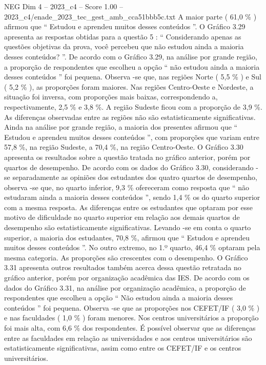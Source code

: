 \begin{textsample}{NEG Dim 4 – 2023\_c4 – Score 1.00 – 2023\_c4/enade\_2023\_tec\_gest\_amb\_cca51bbb5c.txt}
A maior parte ( 61,0 \% ) afirmou que “ Estudou e aprendeu muitos desses conteúdos ”.
O Gráfico 3.29 apresenta as respostas obtidas para a questão 5 : “ Considerando apenas as questões objetivas da prova, você percebeu que não estudou ainda a maioria desses conteúdos? ”.
De acordo com o Gráfico 3.29, na análise por grande região, a proporção de respondentes que escolheu a opção “ não estudou ainda a maioria desses conteúdos ” foi pequena.
Observa -se que, nas regiões Norte ( 5,5 \% ) e Sul ( 5,2 \% ), as proporções foram maiores.
Nas regiões Centro-Oeste e Nordeste, a situação foi inversa, com proporções mais baixas, correspondendo a, respectivamente, 2,5 \% e 3,8 \%.
A região Sudeste ficou com a proporção de 3,9 \%.
As diferenças observadas entre as regiões não são estatisticamente significativas.
Ainda na análise por grande região, a maioria dos presentes afirmou que “ Estudou e aprendeu muitos desses conteúdos ”, com proporções que variam entre 57,8 \%, na região Sudeste, a 70,4 \%, na região Centro-Oeste.
O Gráfico 3.30 apresenta os resultados sobre a questão tratada no gráfico anterior, porém por quartos de desempenho.
De acordo com os dados do Gráfico 3.30, considerando -se separadamente as opiniões dos estudantes dos quatro quartos de desempenho, observa -se que, no quarto inferior, 9,3 \% ofereceram como resposta que “ não estudaram ainda a maioria desses conteúdos ”, sendo 1,4 \% os do quarto superior com a mesma resposta.
As diferenças entre os estudantes que optaram por esse motivo de dificuldade no quarto superior em relação aos demais quartos de desempenho são estatisticamente significativas.
Levando -se em conta o quarto superior, a maioria dos estudantes, 70,8 \%, afirmou que “ Estudou e aprendeu muitos desses conteúdos ”.
No outro extremo, no 1.º quarto, 46,4 \% optaram pela mesma categoria.
As proporções são crescentes com o desempenho.
O Gráfico 3.31 apresenta outros resultados também acerca dessa questão retratada no gráfico anterior, porém por organização acadêmica das IES.
De acordo com os dados do Gráfico 3.31, na análise por organização acadêmica, a proporção de respondentes que escolheu a opção “ Não estudou ainda a maioria desses conteúdos ” foi pequena.
Observa -se que as proporções nos CEFET/IF ( 3,0 \% ) e nas faculdades ( 1,0 \% ) foram menores.
Nos centros universitários a proporção foi mais alta, com 6,6 \% dos respondentes.
É possível observar que as diferenças entre as faculdades em relação as universidades e aos centros universitários são estatisticamente significativas, assim como entre os CEFET/IF e os centros universitários.

\end{textsample}
